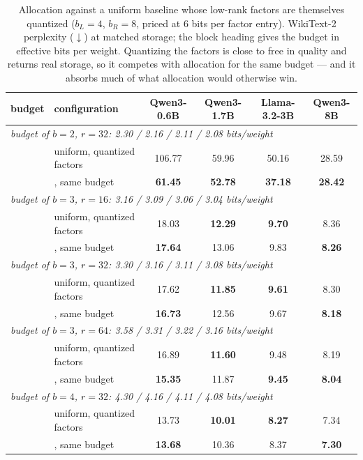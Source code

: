 \begin{table}[H]
\centering
\footnotesize
\setlength{\tabcolsep}{3pt}
\caption{Allocation against a uniform baseline whose low-rank factors are themselves quantized ($b_L = 4$, $b_R = 8$, priced at $6$ bits per factor entry). WikiText-2 perplexity ($\downarrow$) at matched storage; the block heading gives the budget in effective bits per weight. Quantizing the factors is close to free in quality and returns real storage, so it competes with allocation for the same budget --- and it absorbs much of what allocation would otherwise win.}
\label{tab:qfactors}
\begin{tabular}{llcccc}
\toprule
budget & configuration & Qwen3-0.6B & Qwen3-1.7B & Llama-3.2-3B & Qwen3-8B \\
\midrule
\multicolumn{6}{l}{\emph{budget of $b=2$, $r=32$: 2.30 / 2.16 / 2.11 / 2.08 bits/weight}} \\
& uniform, quantized factors & 106.77 & 59.96 & 50.16 & 28.59 \\
& \method{}, same budget & \textbf{61.45} & \textbf{52.78} & \textbf{37.18} & \textbf{28.42} \\
\midrule
\multicolumn{6}{l}{\emph{budget of $b=3$, $r=16$: 3.16 / 3.09 / 3.06 / 3.04 bits/weight}} \\
& uniform, quantized factors & 18.03 & \textbf{12.29} & \textbf{9.70} & 8.36 \\
& \method{}, same budget & \textbf{17.64} & 13.06 & 9.83 & \textbf{8.26} \\
\midrule
\multicolumn{6}{l}{\emph{budget of $b=3$, $r=32$: 3.30 / 3.16 / 3.11 / 3.08 bits/weight}} \\
& uniform, quantized factors & 17.62 & \textbf{11.85} & \textbf{9.61} & 8.30 \\
& \method{}, same budget & \textbf{16.73} & 12.56 & 9.67 & \textbf{8.18} \\
\midrule
\multicolumn{6}{l}{\emph{budget of $b=3$, $r=64$: 3.58 / 3.31 / 3.22 / 3.16 bits/weight}} \\
& uniform, quantized factors & 16.89 & \textbf{11.60} & 9.48 & 8.19 \\
& \method{}, same budget & \textbf{15.35} & 11.87 & \textbf{9.45} & \textbf{8.04} \\
\midrule
\multicolumn{6}{l}{\emph{budget of $b=4$, $r=32$: 4.30 / 4.16 / 4.11 / 4.08 bits/weight}} \\
& uniform, quantized factors & 13.73 & \textbf{10.01} & \textbf{8.27} & 7.34 \\
& \method{}, same budget & \textbf{13.68} & 10.36 & 8.37 & \textbf{7.30} \\
\bottomrule
\end{tabular}
\end{table}
